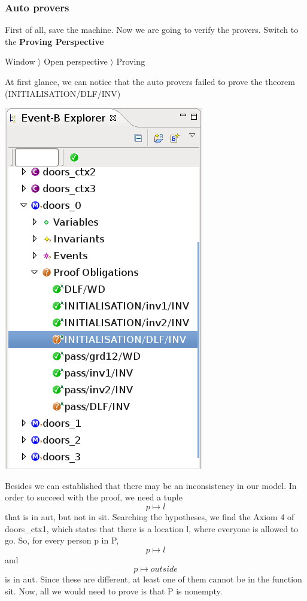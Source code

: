 \subsubsection{Auto provers}

First of all, save the machine. Now we are going to verify the provers. 
Switch to the \textbf{Proving Perspective}

\textsf{ Window $\rangle$ Open perspective $\rangle$ Proving }

At first glance, we can notice that the auto provers failed to prove the theorem (\textsf{INITIALISATION/DLF/INV})
\begin{center}
	\includegraphics[]{img/tutorial/tut_10_proversfailed.png}
\end{center}

Besides we can established that there may be an inconsistency in our model.
In order to succeed with the proof, we need a tuple \[ p \mapsto l \]that is in aut, but not in sit. Searching the hypotheses, we find the Axiom 4 of doors\_ctx1, which states that there is a location l, where everyone is allowed to go. So, for every person p in P, \[p \mapsto l \] and \[p \mapsto outside\] is in aut. Since these are different, at least one of them cannot be in the function sit. Now, all we would need to prove is that P is nonempty. 

